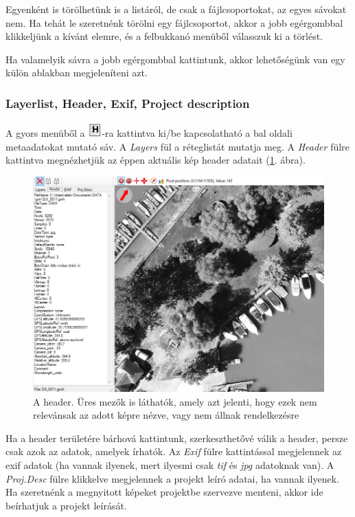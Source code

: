 \documentclass[a4paper,12pt]{article}
\begin{document}
Egyenként is törölhetünk is a listáról, de csak a fájlcsoportokat, az egyes sávokat nem. Ha tehát le szeretnénk törölni egy fájlcsoportot, akkor a jobb egérgombbal klikkeljünk a kívánt elemre, és a felbukkanó menüből válasszuk ki a törlést.

Ha valamelyik sávra a jobb egérgombbal kattintunk, akkor lehetőségünk van egy külön ablakban megjeleníteni azt.

\subsubsection{Layerlist, Header, Exif, Project description}

A gyors menüből a \includegraphics[height=0.55cm]{headerikon}-ra kattintva ki/be kapcsolatható a bal oldali metaadatokat mutató sáv. A \textit{Layers} fül a réteglistát mutatja meg. A \textit{Header} fülre kattintva megnézhetjük az éppen aktuális kép header adatait (\ref{fig:header}. ábra). 

	\begin{figure}
	\centering
	\includegraphics[width=12.5cm]{header}
	\caption{A header. Üres mezők is láthatók, amely azt jelenti, hogy ezek nem relevánsak az adott képre nézve, vagy nem állnak rendelkezésre}
	\label{fig:header}
	\end{figure}



Ha a header területére bárhová kattintunk, szerkeszthetővé válik a header, persze csak azok az adatok, amelyek írhatók. Az \textit{Exif} fülre kattintással megjelennek az exif adatok (ha vannak ilyenek, mert ilyesmi csak \textit{tif} és \textit{jpg} adatoknak van). A \textit{Proj.Desc} fülre klikkelve megjelennek a projekt leíró adatai, ha vannak ilyenek. Ha szeretnénk a megnyitott képeket projektbe szervezve menteni, akkor ide beírhatjuk a projekt leírását.
\end{document}
